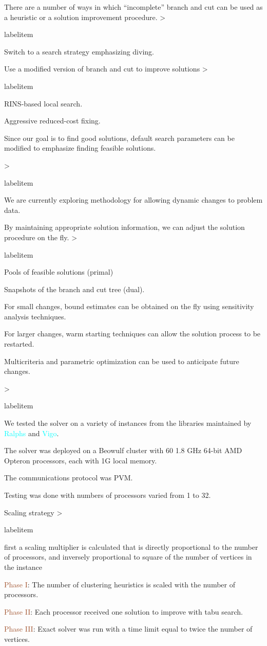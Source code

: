 \documentclass[headrule,landscape]{foils}
\makeatletter
\def\blu#1{\textcolor{blue}{#1}}
\def\cyn#1{\textcolor{cyan}{#1}}
\def\brn#1{\textcolor{sienna}{#1}}
\newcommand{\foil}[1]{\foilhead[-.6in]{\blu{#1}}}
\newcommand{\bi}{\begin{itemize}}
\newcommand{\ei}{\end{itemize}}
\newcommand{\bb}{\item}
\renewenvironment{itemize}[1][0pt]{%
  \ifnum \@itemdepth >\thr@@\@toodeep\else
    \advance\@itemdepth\@ne
    \edef\@itemitem{labelitem\romannumeral\the\@itemdepth}%
    \expandafter
    \list
      \csname\@itemitem\endcsname
      {\def\makelabel##1{\hss\llap{##1}}}\itemsep=#1%
  \fi
}{\endlist}
\makeatother
\begin{document}

\foil{Extensions: Heuristics Based on Branch and Cut}

There are a number of ways in which ``incomplete'' branch and cut can be
used as a heuristic or a solution improvement procedure. 
\bi
\bb Switch to a search strategy emphasizing diving.
\bb Use a modified version of branch and cut to improve solutions
\bi
\bb RINS-based local search.
\bb Aggressive reduced-cost fixing.
\ei
\bb Since our goal is to find good solutions, default search parameters can be
modified to emphasize finding feasible solutions.
\ei
 

\foil{Extensions: Real-time Changes to Problem Data}

\bi
\bb We are currently exploring methodology for allowing dynamic changes to
problem data.
\bb By maintaining appropriate solution information, we can adjust the
solution procedure on the fly.
\bi
\bb Pools of feasible solutions (primal)
\bb Snapshots of the branch and cut tree (dual).
\ei
\bb For small changes, bound estimates can be obtained on the fly using
sensitivity analysis techniques.
\bb For larger changes, warm starting techniques can allow the solution
process to be restarted.
\bb Multicriteria and parametric optimization can be used to anticipate
future changes.
\ei


\foil{Computational Setup}

\bi
 \bb We tested the solver on a variety of instances from the libraries
maintained by \cyn{Ralphs} and \cyn{Vigo}.
 \bb The solver was deployed on a Beowulf cluster with 60 1.8 GHz 64-bit AMD
Opteron processors, each with 1G local memory. 
 \bb The communications protocol was PVM.
 \bb Testing was done with numbers of processors varied from 1 to 32.
 \bb Scaling strategy
 \bi
   \bb first a scaling multiplier is calculated that is directly proportional
    to the number of processors, and inversely proportional to square of the 
    number of vertices in the instance 
   \bb \brn{Phase I}: The number of clustering heuristics is scaled with the
 number of processors.
\bb \brn{Phase II}: Each processor received one solution to improve with tabu
search.
\bb \brn{Phase III}: Exact solver was run with a time limit equal to twice the
number of vertices.
\ei
\ei
\end{document}
